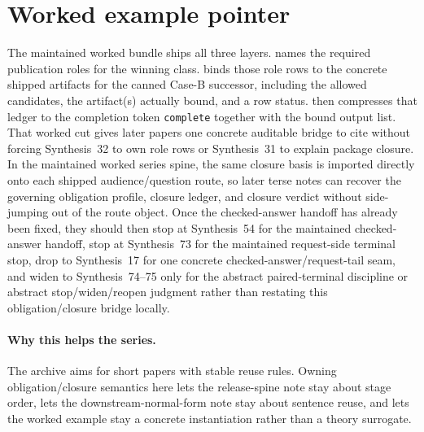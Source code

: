 \documentclass[11pt]{article}
\begin{document}
\section{Worked example pointer}
The maintained worked bundle ships all three layers.\cite{series:workedexample}
 names the required publication roles for the winning class.
 binds those role rows to the concrete shipped artifacts for the canned Case-B successor, including the allowed candidates, the artifact(s) actually bound, and a row status.
 then compresses that ledger to the completion token \texttt{complete} together with the bound output list.
That worked cut gives later papers one concrete auditable bridge to cite without forcing Synthesis~32 to own role rows or Synthesis~31 to explain package closure. In the maintained worked series spine, the same closure basis is imported directly onto each shipped audience/question route, so later terse notes can recover the governing obligation profile, closure ledger, and closure verdict without side-jumping out of the route object. Once the checked-answer handoff has already been fixed, they should then stop at Synthesis~54 for the maintained checked-answer handoff, stop at Synthesis~73 for the maintained request-side terminal stop, drop to Synthesis~17 for one concrete checked-answer/request-tail seam, and widen to Synthesis~74--75 only for the abstract paired-terminal discipline or abstract stop/widen/reopen judgment rather than restating this obligation/closure bridge locally.\cite{series:challengeanswerreviewmenus,series:pairedterminalcitationdiscipline,series:pairedterminalcutoverrules,series:workedexample}

\paragraph{Why this helps the series.}
The archive aims for short papers with stable reuse rules.
Owning obligation/closure semantics here lets the release-spine note stay about stage order, lets the downstream-normal-form note stay about sentence reuse, and lets the worked example stay a concrete instantiation rather than a theory surrogate.
\end{document}
